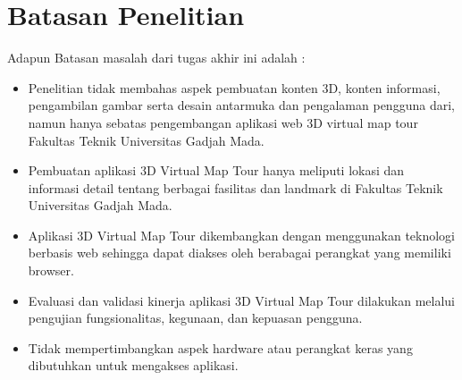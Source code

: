 		


\section{Batasan Penelitian}

Adapun Batasan masalah dari tugas akhir ini adalah :

\begin{itemize}
\item Penelitian tidak membahas aspek pembuatan konten 3D, konten informasi, pengambilan gambar serta desain antarmuka dan pengalaman pengguna dari, namun hanya sebatas pengembangan aplikasi web 3D virtual map tour Fakultas Teknik Universitas Gadjah Mada.
\item Pembuatan aplikasi 3D Virtual Map Tour hanya meliputi lokasi dan informasi detail tentang berbagai fasilitas dan landmark di Fakultas Teknik Universitas Gadjah Mada.
\item Aplikasi 3D Virtual Map Tour dikembangkan dengan menggunakan teknologi berbasis web sehingga dapat diakses oleh berabagai perangkat yang memiliki browser.
\item Evaluasi dan validasi kinerja aplikasi 3D Virtual Map Tour dilakukan melalui pengujian fungsionalitas, kegunaan, dan kepuasan pengguna.
\item Tidak mempertimbangkan aspek hardware atau perangkat keras yang dibutuhkan untuk mengakses aplikasi.
\end{itemize}

